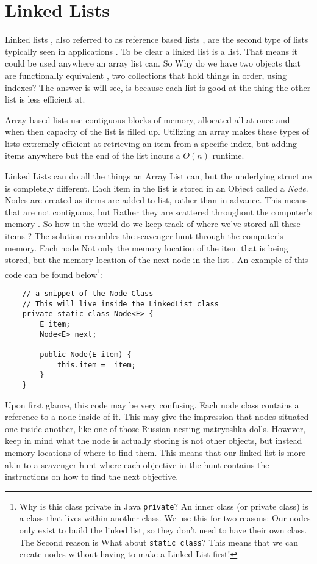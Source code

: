 
\chapter{Linked Lists}
Linked lists , also referred to as reference based lists , are the second type of lists typically seen in applications . To be clear a linked list is a list. That means it could be used anywhere an array list can.   So Why do we have two objects that are functionally equivalent , two collections that hold things in order, using indexes?  The answer is will see, is because each list is good at the thing the other list is less efficient at.


Array based lists use contiguous blocks of memory, allocated all at once and when then capacity of the list is filled up.  Utilizing an array makes these types of lists extremely efficient at retrieving an item from a specific index, but adding items anywhere but the end of the list incurs a $O(n)$ runtime.



Linked Lists can do all the things an Array List can, but the underlying structure is completely different.  
Each item in the list is stored in an Object called a \textit{Node}.  Nodes are created as items are added to list, rather than in advance.  This means that are not contiguous, but Rather they are scattered throughout the computer's memory . So how in the world do we keep track of where we've stored all these items ? The solution resembles the scavenger hunt through the computer's memory.  Each node Not only the memory location of the item that is being stored, but the memory location of the next node in the list . An example of this code can be found below\footnote{Why is this class private in Java \texttt{private}? An inner class  (or private class) is a class that lives within another class.  We use this for two reasons:  Our nodes only exist to build the linked list, so they don't need to have their own class.  The Second reason is   What about \texttt{static class}? This means that we can create nodes without having to make a Linked List first! }: %

\begin{verbatim}
	// a snippet of the Node Class
	// This will live inside the LinkedList class
	private static class Node<E> {
		E item;
		Node<E> next;
		
		public Node(E item) {
			this.item =  item;
		}
	} 
\end{verbatim}
Upon first glance, this code may be very confusing. Each node class contains a reference to a node inside of it.  This may give the impression that nodes  situated one inside another, like one of those Russian nesting matryoshka dolls.  
However, keep in mind what the node is actually storing is not other objects, but instead memory locations of where to find them.
This means that our linked list is more akin to a scavenger hunt where each objective in the hunt contains the instructions on how to find the next objective.

